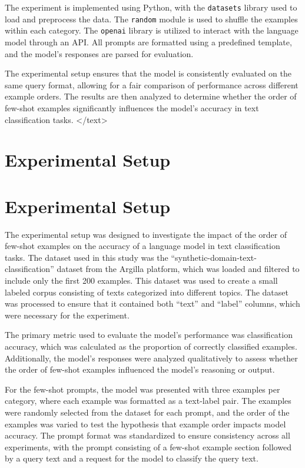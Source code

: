 \documentclass{article}
\begin{document}
The experiment is implemented using Python, with the \texttt{datasets} library used to load and preprocess the data. The \texttt{random} module is used to shuffle the examples within each category. The \texttt{openai} library is utilized to interact with the language model through an API. All prompts are formatted using a predefined template, and the model's responses are parsed for evaluation.

The experimental setup ensures that the model is consistently evaluated on the same query format, allowing for a fair comparison of performance across different example orders. The results are then analyzed to determine whether the order of few-shot examples significantly influences the model's accuracy in text classification tasks.
</text>
\section{Experimental Setup}
\section{Experimental Setup}

The experimental setup was designed to investigate the impact of the order of few-shot examples on the accuracy of a language model in text classification tasks. The dataset used in this study was the ``synthetic-domain-text-classification'' dataset from the Argilla platform, which was loaded and filtered to include only the first 200 examples. This dataset was used to create a small labeled corpus consisting of texts categorized into different topics. The dataset was processed to ensure that it contained both ``text'' and ``label'' columns, which were necessary for the experiment.

The primary metric used to evaluate the model's performance was classification accuracy, which was calculated as the proportion of correctly classified examples. Additionally, the model's responses were analyzed qualitatively to assess whether the order of few-shot examples influenced the model's reasoning or output.

For the few-shot prompts, the model was presented with three examples per category, where each example was formatted as a text-label pair. The examples were randomly selected from the dataset for each prompt, and the order of the examples was varied to test the hypothesis that example order impacts model accuracy. The prompt format was standardized to ensure consistency across all experiments, with the prompt consisting of a few-shot example section followed by a query text and a request for the model to classify the query text.
\end{document}
